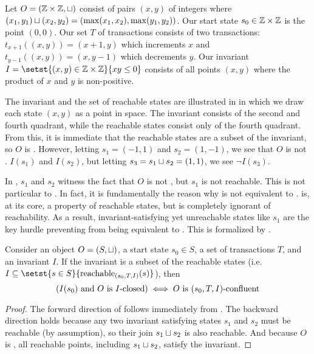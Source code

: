 {}

\begin{example}
  Let $O = (\mathbb{Z} \times \mathbb{Z}, \sqcup)$ consist of pairs $(x, y)$ of integers
  where $(x_1, y_1) \sqcup (x_2, y_2) = (\max(x_1, x_2), \max(y_1, y_2))$. Our
  start state $s_0 \in \mathbb{Z} \times \mathbb{Z}$ is the point $(0, 0)$. Our set $T$
  of transactions consists of two transactions: $t_{x+1}((x, y)) = (x + 1, y)$
  which increments $x$ and $t_{y-1}((x, y)) = (x, y - 1)$ which decrements $y$.
  Our invariant $I = \setst{(x, y) \in \ints \times \ints}{xy \leq 0}$ consists
  of all points $(x, y)$ where the product of $x$ and $y$ is non-positive.

  The invariant and the set of reachable states are illustrated in 
  in which we draw each state $(x, y)$ as a point in space. The invariant
  consists of the second and fourth quadrant, while the reachable states consist only
  of the fourth quadrant. From this, it is immediate that the reachable states
  are a subset of the invariant, so $O$ is \invariantconfluent{}. However,
  letting $s_1 = (-1, 1)$ and $s_2 = (1, -1)$, we see that $O$ is not
  \invariantclosed{}. $I(s_1)$ and $I(s_2)$, but letting $s_3 = s_1 \sqcup s_2 =
  (1, 1)$, we see $\lnot I(s_3)$.
\end{example}

In , $s_1$ and $s_2$ witness the fact that $O$ is not
\invariantclosed{}, but $s_1$ is not reachable. This is not particular to
. In fact, it is fundamentally the reason why
\invariantclosure{} is not equivalent to \invariantconfluence{}.
\Invariantconfluence{} is, at its core, a property of reachable states, but
\invariantclosure{} is completely ignorant of reachability. As a result,
invariant-satisfying yet unreachable states like $s_1$ are the key hurdle
preventing \invariantclosure{} from being equivalent to \invariantconfluence{}.
This is formalized by .

\begin{theorem}
  Consider an object $O = (S, \sqcup)$, a start state $s_0 \in S$, a set of
  transactions $T$, and an invariant $I$. If the invariant is a subset of the
  reachable states (i.e. $I \subseteq \setst{s \in
  S}{\sTIreachablepredicate{s}}$), then
  \[
    (\text{$I(s_0)$ and $O$ is $I$-closed{}}) \iff \text{$O$ is $(s_0, T, I)$-confluent{}}
  \]
\end{theorem}
\begin{proof}
  The forward direction of  follows
  immediately from . The backward direction
  holds because any two invariant satisfying states $s_1$ and $s_2$ must be
  reachable (by assumption), so their join $s_1 \sqcup s_2$ is also reachable.
  And because $O$ is \sTIconfluent{}, all reachable points, including $s_1
  \sqcup s_2$, satisfy the invariant.
\end{proof}
